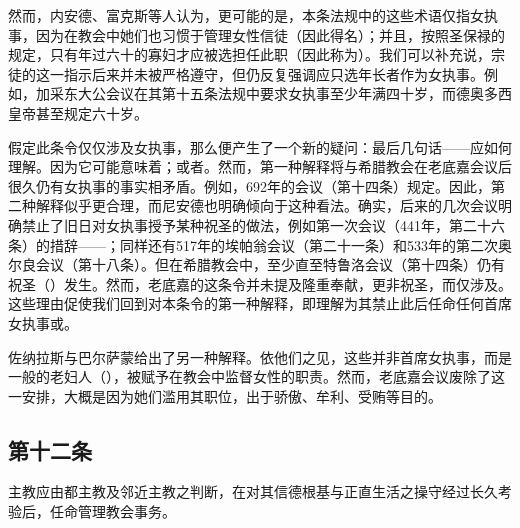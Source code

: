 然而，内安德、富克斯等人认为，更可能的是，本条法规中的这些术语仅指女执事，因为在教会中她们也习惯于管理女性信徒（因此得名）；并且，按照圣保禄的规定，只有年过六十的寡妇才应被选担任此职（因此称为）。我们可以补充说，宗徒的这一指示后来并未被严格遵守，但仍反复强调应只选年长者作为女执事。例如，加采东大公会议在其第十五条法规中要求女执事至少年满四十岁，而德奥多西皇帝甚至规定六十岁。\par

假定此条令仅仅涉及女执事，那么便产生了一个新的疑问：最后几句话——应如何理解。因为它可能意味着；或者。然而，第一种解释将与希腊教会在老底嘉会议后很久仍有女执事的事实相矛盾。例如，692年的会议（第十四条）规定。因此，第二种解释似乎更合理，而尼安德也明确倾向于这种看法。确实，后来的几次会议明确禁止了旧日对女执事授予某种祝圣的做法，例如第一次会议（441年，第二十六条）的措辞——；同样还有517年的埃帕翁会议（第二十一条）和533年的第二次奥尔良会议（第十八条）。但在希腊教会中，至少直至特鲁洛会议（第十四条）仍有祝圣（）发生。然而，老底嘉的这条令并未提及隆重奉献，更非祝圣，而仅涉及。这些理由促使我们回到对本条令的第一种解释，即理解为其禁止此后任命任何首席女执事或。\par

佐纳拉斯与巴尔萨蒙给出了另一种解释。依他们之见，这些并非首席女执事，而是一般的老妇人（），被赋予在教会中监督女性的职责。然而，老底嘉会议废除了这一安排，大概是因为她们滥用其职位，出于骄傲、牟利、受贿等目的。\par


\subsection{第十二条}

主教应由都主教及邻近主教之判断，在对其信德根基与正直生活之操守经过长久考验后，任命管理教会事务。\par


